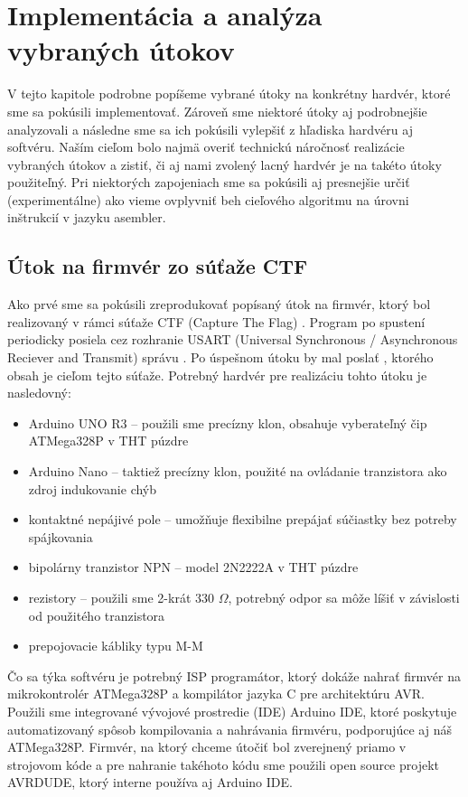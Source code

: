 \chapter{Implementácia a analýza vybraných útokov}

\label{kap:utoky} %

V tejto kapitole podrobne popíšeme vybrané útoky na konkrétny hardvér, ktoré sme sa pokúsili implementovať. Zároveň sme niektoré útoky aj podrobnejšie analyzovali a následne sme sa ich pokúsili vylepšiť z hľadiska hardvéru aj softvéru. Naším cieľom bolo najmä overiť technickú náročnosť realizácie vybraných útokov a zistiť, či aj nami zvolený lacný hardvér je na takéto útoky použiteľný. Pri niektorých zapojeniach sme sa pokúsili aj presnejšie určiť (experimentálne) ako vieme ovplyvniť beh cieľového algoritmu na úrovni inštrukcií v jazyku asembler.

\section{Útok na firmvér zo súťaže CTF}
Ako prvé sme sa pokúsili zreprodukovať popísaný útok na firmvér, ktorý bol realizovaný v rámci súťaže CTF (Capture The Flag) \cite{vccOnTheCheap}. Program po spustení periodicky posiela cez rozhranie USART (Universal Synchronous / Asynchronous Reciever and Transmit) správu . Po úspešnom útoku by mal poslať , ktorého obsah je cieľom tejto súťaže. Potrebný hardvér pre realizáciu tohto útoku je nasledovný:
\begin{itemize}
    \item Arduino UNO R3 -- použili sme precízny klon, obsahuje vyberateľný čip ATMega328P v THT púzdre
    \item Arduino Nano -- taktiež precízny klon, použité na ovládanie tranzistora ako zdroj indukovanie chýb
    \item kontaktné nepájivé pole -- umožňuje flexibilne prepájať súčiastky bez potreby spájkovania
    \item bipolárny tranzistor NPN -- model 2N2222A v THT púzdre
    \item rezistory -- použili sme 2-krát 330 $\Omega$, potrebný odpor sa môže líšiť v závislosti od použitého tranzistora
    \item prepojovacie kábliky typu M-M
\end{itemize}
Čo sa týka softvéru je potrebný ISP programátor, ktorý dokáže nahrať firmvér na mikrokontrolér ATMega328P a kompilátor jazyka C pre architektúru AVR. Použili sme integrované vývojové prostredie (IDE) Arduino IDE, ktoré poskytuje automatizovaný spôsob kompilovania a nahrávania firmvéru, podporujúce aj náš ATMega328P. Firmvér, na ktorý chceme útočiť bol zverejnený priamo v strojovom kóde a pre nahranie takéhoto kódu sme použili open source projekt AVRDUDE, ktorý interne používa aj Arduino IDE.

